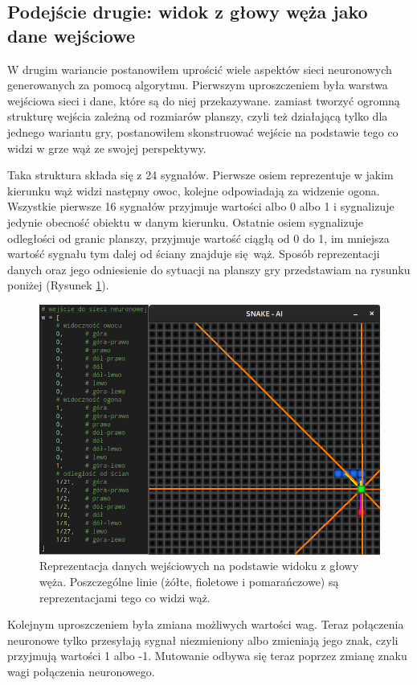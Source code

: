 \documentclass[12pt, oneside, a4paper]{report}
\begin{document}
\subsection{Podejście drugie: widok z głowy węża jako dane wejściowe}

W drugim wariancie postanowiłem uprościć wiele aspektów sieci neuronowych generowanych za pomocą algorytmu. Pierwszym uproszczeniem była warstwa wejściowa sieci i dane, które są do niej przekazywane. zamiast tworzyć ogromną strukturę wejścia zależną od rozmiarów planszy, czyli też działającą tylko dla jednego wariantu gry, postanowiłem skonstruować wejście na podstawie tego co widzi w grze wąż ze swojej perspektywy. 

Taka struktura składa się z 24 sygnałów. Pierwsze osiem reprezentuje w jakim kierunku wąż widzi następny owoc, kolejne odpowiadają za widzenie ogona. Wszystkie pierwsze 16 sygnałów przyjmuje wartości albo 0 albo 1 i sygnalizuje jedynie obecność obiektu w danym kierunku. Ostatnie osiem sygnalizuje odległości od granic planszy, przyjmuje wartość ciągłą od 0 do 1, im mniejsza wartość sygnału tym dalej od ściany znajduje się wąż. Sposób reprezentacji danych oraz jego odniesienie do sytuacji na planszy gry przedstawiam na rysunku poniżej (Rysunek \ref{fig: 4.head-view}).

\begin{figure}[h]
	\centering
	\includegraphics[width=12cm]{head-view.png}
	\caption{Reprezentacja danych wejściowych na podstawie widoku z głowy węża. Poszczególne linie (żółte, fioletowe i pomarańczowe) są reprezentacjami tego co widzi wąż.}
	\label{fig: 4.head-view}
\end{figure}

Kolejnym uproszczeniem była zmiana możliwych wartości wag. Teraz połączenia neuronowe tylko przesyłają sygnał niezmieniony albo zmieniają jego znak, czyli przyjmują wartości 1 albo -1. Mutowanie odbywa się teraz poprzez zmianę znaku wagi połączenia neuronowego.
\end{document}
